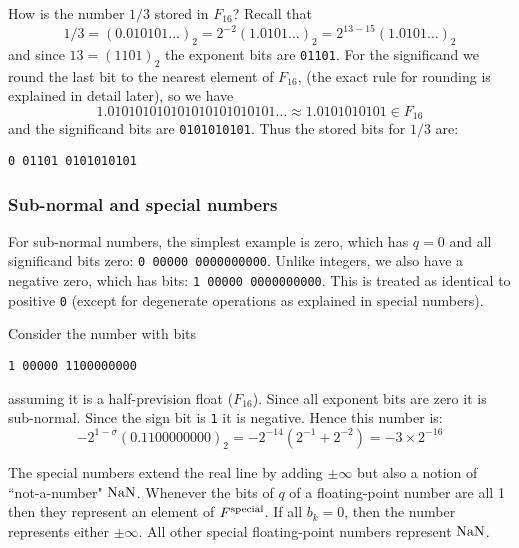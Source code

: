 \begin{example} How is the number $1/3$ stored in $F_{16}$? Recall that
\[
1/3 = (0.010101\ensuremath{\ldots})_2 = 2^{-2} (1.0101\ensuremath{\ldots})_2 = 2^{13-15} (1.0101\ensuremath{\ldots})_2
\]
and since $13 = (1101)_2$  the exponent bits are \texttt{01101}. For the significand we round the last bit to the nearest element of $F_{16}$,  (the exact rule for rounding is explained in detail later), so we have
\[
1.010101010101010101010101\ensuremath{\ldots}\approx 1.0101010101 \in F_{16} 
\]
and the significand bits are \texttt{0101010101}. Thus the stored bits for $1/3$ are:

\begin{verbatim}
0 01101 0101010101
\end{verbatim}
\end{example}

\subsubsection{Sub-normal and special numbers}
For sub-normal numbers, the simplest example is zero, which has $q=0$ and all significand bits zero: \texttt{0 00000 0000000000}. Unlike integers, we also have a negative zero, which has bits: \texttt{1 00000 0000000000}. This is treated as identical to positive \texttt{0} (except for degenerate operations as explained in special numbers).

\begin{example} Consider the number with bits

\begin{verbatim}
1 00000 1100000000
\end{verbatim}
assuming it is a half-prevision float ($F_{16}$).  Since all exponent bits are zero it is sub-normal. Since the sign bit is \texttt{1} it is negative.  Hence this number is:
\[
-2^{1-\ensuremath{\sigma}} (0.1100000000)_2 = -2^{-14} (2^{-1} + 2^{-2}) = -3 \ensuremath{\times} 2^{-16}
\]
\end{example}

The special numbers extend the real line by adding $\ensuremath{\pm}\ensuremath{\infty}$ but also a notion of ``not-a-number" ${\rm NaN}$. Whenever the bits of $q$ of a floating-point number are all 1 then they represent an element of $F^{\rm special}$. If all $b_k=0$, then the number represents either $\ensuremath{\pm}\ensuremath{\infty}$. All other special floating-point numbers represent ${\rm NaN}$. 

